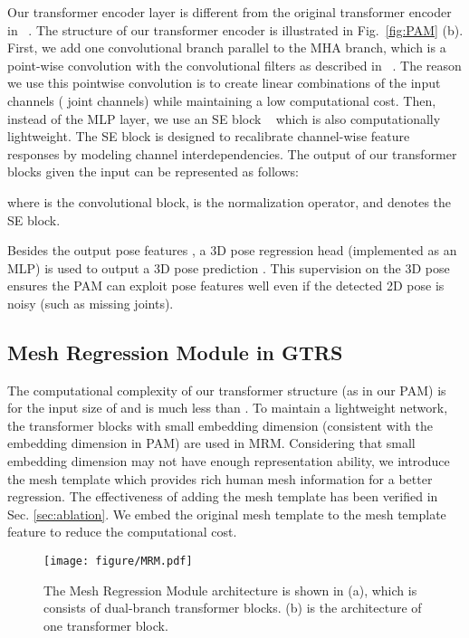 \documentclass[sigconf]{acmart}
\begin{document}
Our transformer encoder layer is different from the original transformer encoder in ~\cite{Dosovitskiy2020ViT}. The structure of our transformer encoder is illustrated in Fig.~\ref{fig:PAM} (b). First, we add one convolutional branch parallel to the MHA branch, which is a point-wise convolution with the  convolutional filters as described in ~\cite{howard2017mobilenets}. The reason we use this pointwise convolution is to create linear combinations of the input channels ( joint channels) while maintaining a low computational cost. Then, instead of the MLP layer, we use an SE block ~\cite{hu2018senet} which is also computationally lightweight. The SE block is designed to recalibrate channel-wise feature responses by modeling channel interdependencies. 
The output of our transformer blocks given the input   can be represented as follows:

where    is the convolutional block,  is the normalization operator, and  denotes the SE block. 

Besides the output pose features , a 3D pose regression head (implemented as an MLP) is used to output a 3D pose prediction . This supervision on the 3D pose ensures the PAM can exploit pose features well even if the detected 2D pose is noisy (such as missing joints).









\subsection{Mesh Regression Module in GTRS}
The computational complexity of our transformer structure (as in our PAM) is  for the input size of   and  is much less than . To maintain a lightweight network, the transformer blocks with small embedding dimension  (consistent with the embedding dimension in PAM) are used in MRM. 
Considering that small embedding dimension  may not have enough representation ability, 
we introduce the mesh template which provides rich human mesh information for a better regression. The effectiveness of adding the mesh template has been verified in Sec. \ref{sec:ablation}. We embed the original mesh template to the mesh template feature  to reduce the computational cost. 

\begin{figure}[htp]
\vspace{-5pt}
  \centering
  \texttt{[image: figure/MRM.pdf]}
\caption{The Mesh Regression Module architecture is shown in (a), which is consists of dual-branch transformer blocks. (b) is the architecture of one transformer block.}
  \label{fig:MRM}
  \vspace{-15pt}
\end{figure}
\end{document}
